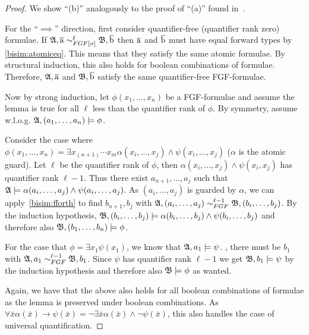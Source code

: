 \begin{proof}
  We show ``(b)'' analogously to the proof of ``(a)'' found in~\cite[appendix]{BednarczykJ22}.

  For the ``$\implies$'' direction, first consider quantifier-free (quantifier rank zero) formulae.
  If $\str{A}, \elemtuplea \bisimto_{\FGF[\sigma]}^{\ell} \str{B}, \elemtupleb$ then $\overline{\mathrm{a}}$ and $\overline{\mathrm{b}}$ must have equal forward types by \ref{bisim:atomiceq}.
  This means that they satisfy the same atomic formulae.
  By structural induction, this also holds for boolean combinations of formulae.
  Therefore, ${\mathfrak{A}}, \overline{\mathrm{a}}$ and ${\mathfrak{B}}, \overline{\mathrm{b}}$ satisfy the same quantifier-free FGF-formulae.

  Now by strong induction, let $\phi(x_{1}, \ldots, x_{n})$ be a FGF-formulae and assume the lemma is true for all $\ell$ less than the quantifier rank of $\phi$.
  By symmetry, assume w.l.o.g. ${\mathfrak{A}}, (a_{1}, \ldots, a_{n}) \models \phi$.

  Consider the case where $\phi(x_{1}, \ldots, x_{n}) = \exists{x_{(n+1)}\cdots{}x_{m}} \alpha(x_{i}, \ldots, x_{j}) \land \psi(x_{i}, \ldots, x_{j})$ ($\alpha$ is the atomic guard).
  Let $\ell$ be the quantifier rank of $\phi$, then $\alpha(x_{i},\ldots,x_{j}) \land \psi(x_{i}, x_{j})$ has quantifier rank $\ell - 1$.
  Thus there exist $a_{n+1}, \ldots, a_{j}$ such that ${\mathfrak{A}} \models \alpha(a_{i}, \ldots, a_{j}) \land \psi(a_{i}, \ldots, a_{j})$.
  As $(a_{i}, \ldots, a_{j})$ is guarded by $\alpha$, we can apply~\ref{bisim:fforth} to find $b_{n+1}, b_{j}$ with $\str{A}, (a_{i}, \ldots, a_{j}) \sim_{\FGF}^{\ell-1} \str{B}, (b_{i}, \ldots, b_{j})$.
  By the induction hypothesis, ${\mathfrak{B}}, (b_{i}, \ldots, b_{j}) \models \alpha(b_{i}, \ldots, b_{j}) \land \psi(b_{i}, \ldots, b_{j})$ and therefore also ${\mathfrak{B}}, (b_{1}, \ldots, b_{n}) \models \phi$.

  For the case that $\phi = \exists{x_{1}} \psi(x_{1})$, we know that ${\mathfrak{A}}, a_{1} \models \psi$.
  , there must be $b_{1}$ with $\str{A}, a_{1} \bisimto_{\FGF}^{\ell-1} \str{B}, b_{1}$.
  Since $\psi$ has quantifier rank $\ell - 1$ we get ${\mathfrak{B}}, b_{1} \models \psi$ by the induction hypothesis and therefore also ${\mathfrak{B}} \models \phi$ as wanted.

  Again, we have that the above also holds for all boolean combinations of formulae as the lemma is preserved under boolean combinations.
  As $\forall{\bar{x}} \alpha(\bar{x}) \rightarrow \psi(\bar{x}) = \neg \exists{\bar{x}} \alpha(\bar{x}) \land \neg \psi(\bar{x})$, this also handles the case of universal quantification.


\end{proof}
